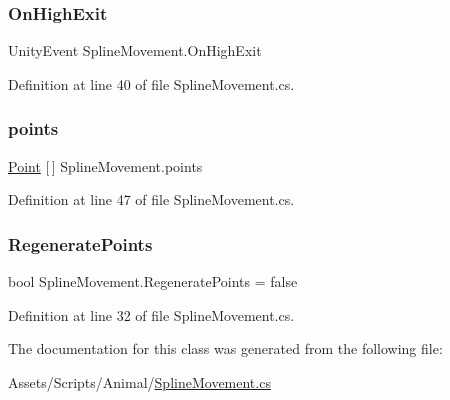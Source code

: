 \subsubsection{\texorpdfstring{On\+High\+Exit}{OnHighExit}}
{\footnotesize\ttfamily Unity\+Event Spline\+Movement.\+On\+High\+Exit}



Definition at line 40 of file Spline\+Movement.\+cs.

\mbox{\label{class_spline_movement_a3ab10a8f9594bbaf278ac2c7c8e6858d}} 
\subsubsection{\texorpdfstring{points}{points}}
{\footnotesize\ttfamily \mbox{\hyperlink{class_spline_movement_1_1_point}{Point}} \mbox{[}$\,$\mbox{]} Spline\+Movement.\+points}



Definition at line 47 of file Spline\+Movement.\+cs.

\mbox{\label{class_spline_movement_a6f38fd94d067872d8f11b50965ac776f}} 
\subsubsection{\texorpdfstring{Regenerate\+Points}{RegeneratePoints}}
{\footnotesize\ttfamily bool Spline\+Movement.\+Regenerate\+Points = false}



Definition at line 32 of file Spline\+Movement.\+cs.



The documentation for this class was generated from the following file\+:\begin{DoxyCompactItemize}
\item 
Assets/\+Scripts/\+Animal/\mbox{\hyperlink{_spline_movement_8cs}{Spline\+Movement.\+cs}}\end{DoxyCompactItemize}
